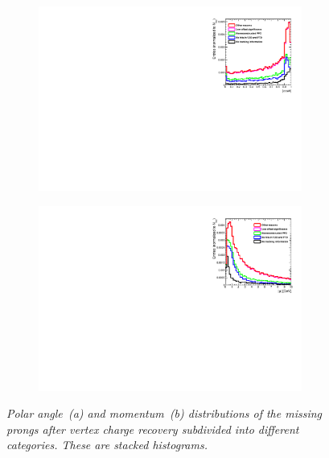 \begin{figure}[h]
\centering
\begin{subfigure}{0.5\textwidth}
    \includegraphics[width=0.95\textwidth]{ILD/plots/recovery-missed-cos.pdf}
\caption{\label{fig:RecoveryMissingTracks_cos_3} }
\end{subfigure}%
  \begin{subfigure}{0.5\textwidth}
\centering
    \includegraphics[width=0.95\textwidth]{ILD/plots/recovery-missed-p.pdf}
\caption{\label{fig:RecoveryMissingTracks_p_3} }
\end{subfigure}
    \caption{\sl Polar angle~(a) and momentum~(b) distributions of the missing prongs after vertex charge recovery subdivided into different categories. These are stacked histograms. }
    \label{fig:RecoveryMissingTracks_3}
\end{figure}

